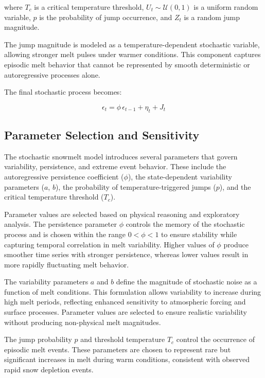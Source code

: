 \documentclass[11pt]{article}
\begin{document}
	where $T_c$ is a critical temperature threshold, $U_t \sim \mathcal{U}(0,1)$ is a uniform random variable, $p$ is the probability of jump occurrence, and $Z_t$ is a random jump magnitude.
	
	The jump magnitude is modeled as a temperature-dependent stochastic variable, allowing stronger melt pulses under warmer conditions. This component captures episodic melt behavior that cannot be represented by smooth deterministic or autoregressive processes alone.
	
	The final stochastic process becomes:
	
	\begin{equation}
		\epsilon_t = \phi \, \epsilon_{t-1} + \eta_t + J_t
	\end{equation}
	
	\subsection{Parameter Selection and Sensitivity}
	
	The stochastic snowmelt model introduces several parameters that govern variability, persistence, and extreme event behavior. These include the autoregressive persistence coefficient ($\phi$), the state-dependent variability parameters ($a$, $b$), the probability of temperature-triggered jumps ($p$), and the critical temperature threshold ($T_c$).
	
	Parameter values are selected based on physical reasoning and exploratory analysis. The persistence parameter $\phi$ controls the memory of the stochastic process and is chosen within the range $0 < \phi < 1$ to ensure stability while capturing temporal correlation in melt variability. Higher values of $\phi$ produce smoother time series with stronger persistence, whereas lower values result in more rapidly fluctuating melt behavior.
	
	The variability parameters $a$ and $b$ define the magnitude of stochastic noise as a function of melt conditions. This formulation allows variability to increase during high melt periods, reflecting enhanced sensitivity to atmospheric forcing and surface processes. Parameter values are selected to ensure realistic variability without producing non-physical melt magnitudes.
	
	The jump probability $p$ and threshold temperature $T_c$ control the occurrence of episodic melt events. These parameters are chosen to represent rare but significant increases in melt during warm conditions, consistent with observed rapid snow depletion events.
	
\end{document}
